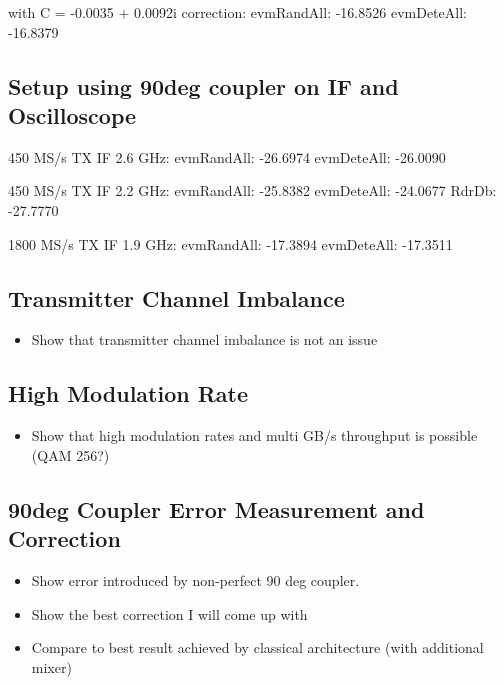 with C = -0.0035 + 0.0092i correction:
    evmRandAll: -16.8526
    evmDeteAll: -16.8379

\subsection{Setup using 90deg coupler on IF and Oscilloscope}



450 MS/s TX IF 2.6 GHz:
    evmRandAll: -26.6974
    evmDeteAll: -26.0090

450 MS/s TX IF 2.2 GHz:
    evmRandAll: -25.8382
    evmDeteAll: -24.0677
    RdrDb: -27.7770

1800 MS/s TX IF 1.9 GHz:
    evmRandAll: -17.3894
    evmDeteAll: -17.3511




\subsection{Transmitter Channel Imbalance}
\begin{itemize}
\item Show that transmitter channel imbalance is not an issue
\end{itemize}

\subsection{High Modulation Rate}
\begin{itemize}
\item Show that high modulation rates and multi GB/s throughput is possible (\gls{QAM} 256?)
\end{itemize}

\subsection{90deg Coupler Error Measurement and Correction}
\begin{itemize}
\item Show error introduced by non-perfect 90 deg coupler.
\item Show the best correction I will come up with
\item Compare to best result achieved by classical architecture (with additional mixer)
\end{itemize}

